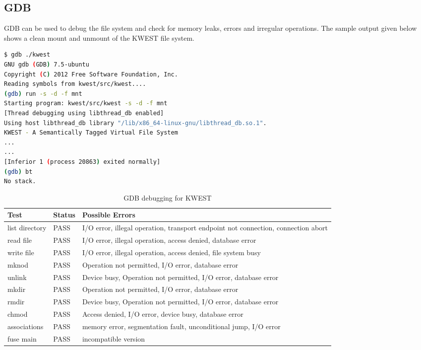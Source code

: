 \subsection*{GDB}
GDB can be used to debug the file system and check for memory leaks, errors and irregular operations. The sample output given below shows a clean mount and unmount of the KWEST file system.
\begin{lstlisting}[language=bash,frame=single]
$ gdb ./kwest
GNU gdb (GDB) 7.5-ubuntu
Copyright (C) 2012 Free Software Foundation, Inc.
Reading symbols from kwest/src/kwest....
(gdb) run -s -d -f mnt
Starting program: kwest/src/kwest -s -d -f mnt
[Thread debugging using libthread_db enabled]
Using host libthread_db library "/lib/x86_64-linux-gnu/libthread_db.so.1".
KWEST - A Semantically Tagged Virtual File System
...
...
[Inferior 1 (process 20863) exited normally]
(gdb) bt
No stack.
\end{lstlisting}

\begin{table}[h]
\begin{tabular}{|p{3cm}|p{2cm}|p{8cm}|}
\hline
\textbf{Test} & \textbf{Status} & \textbf{Possible Errors} \\ \hline
list directory	&	PASS &  I/O error, illegal operation, transport endpoint not connection, connection abort \\ \hline
read file & PASS & I/O error, illegal operation, access denied, database error \\ \hline
write file & PASS & I/O error, illegal operation, access denied, file system busy \\ \hline
mknod & PASS & Operation not permitted, I/O error, database error \\ \hline
unlink & PASS & Device busy, Operation not permitted, I/O error, database error \\ \hline
mkdir & PASS & Operation not permitted, I/O error, database error \\ \hline
rmdir & PASS & Device busy, Operation not permitted, I/O error, database error \\ \hline
chmod & PASS & Access denied, I/O error, device busy, database error \\ \hline
associations & PASS & memory error, segmentation fault, unconditional jump, I/O error \\ \hline
fuse main & PASS & incompatible version \\
\hline
\end{tabular}
\caption{GDB debugging for KWEST}
\label{tab:GDB}
\end{table}
